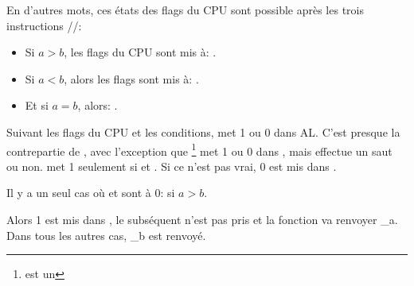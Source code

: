 En d'autres mots, ces états des flags du CPU sont possible après les
trois instructions \FUCOMPP/\FNSTSW/\SAHF:

\begin{itemize}
\item Si $a>b$, les flags du CPU sont mis à: .
\item Si $a<b$, alors les flags sont mis à: .
\item Et si $a=b$, alors: .
\end{itemize}


Suivant les flags du CPU et les conditions, \SETNBE met 1 ou 0 dans AL.
C'est presque la contrepartie de \JNBE, avec l'exception que \SETcc\footnote{
est un } met 1 ou 0 dans \AL, mais \Jcc effectue un saut ou non.
\SETNBE met 1 seulement si  et .
Si ce n'est pas vrai, 0 est mis dans \AL.

Il y a un seul cas où \CF et \ZF sont à 0: si $a>b$.

Alors 1 est mis dans \AL, le \JZ subséquent n'est pas pris et la fonction va renvoyer
{\_a}.
Dans tous les autres cas, {\_b} est renvoyé.


